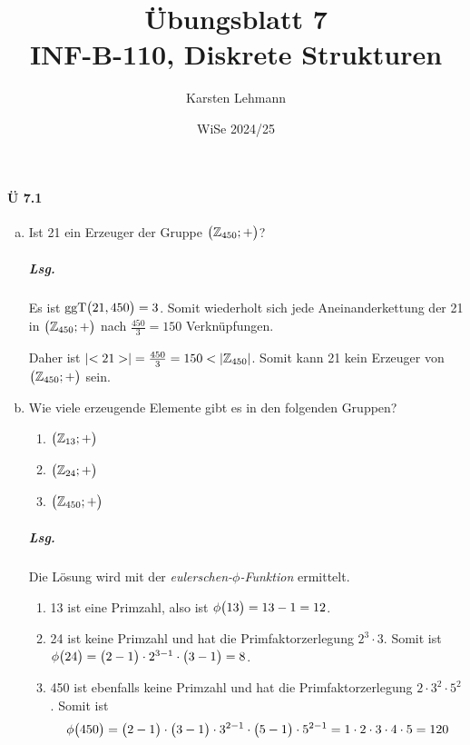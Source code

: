 \documentclass{scrreprt}
\author{Karsten Lehmann}
\date{WiSe 2024/25}
\title{Übungsblatt 7\\INF-B-110, Diskrete Strukturen}
\newcommand{\ggT}[0]{\text{ggT}}
\begin{document}
\paragraph{Ü 7.1}
\begin{enumerate}[(a)]
\item Ist 21 ein Erzeuger der Gruppe $\qty\big(\mathbb{Z}_{450}; +)$?

  \subparagraph{Lsg.} Es ist $\ggT\qty\big(21, 450) = 3$.
  Somit wiederholt sich jede Aneinanderkettung der 21 in
  $\qty\big(\mathbb{Z}_{450}; +)$ nach $\frac{450}{3} = 150$ Verknüpfungen.

  Daher ist $\abs{<21>} = \frac{450}{3} = 150 < \abs{\mathbb{Z}_{450}}$.
  Somit kann 21 kein Erzeuger von $\qty\big(\mathbb{Z}_{450}; +)$ sein.

\item Wie viele erzeugende Elemente gibt es in den folgenden Gruppen?
  \begin{enumerate}[(1)]
  \item $\qty\big(\mathbb{Z}_{13}; +)$
  \item $\qty\big(\mathbb{Z}_{24}; +)$
  \item $\qty\big(\mathbb{Z}_{450}; +)$
  \end{enumerate}

  \subparagraph{Lsg.} Die Lösung wird mit der \emph{eulerschen-$\phi$-Funktion}
  ermittelt.
  \begin{enumerate}[(1)]
  \item 13 ist eine Primzahl, also ist $\phi\qty\big(13) = 13 - 1 = 12$.
  \item 24 ist keine Primzahl und hat die Primfaktorzerlegung $2^3 \cdot 3$.
    Somit ist $\phi\qty\big(24)
    = \qty\big(2 - 1) \cdot 2^{3 - 1} \cdot \qty\big(3 - 1) = 8$.
  \item 450 ist ebenfalls keine Primzahl und hat die Primfaktorzerlegung
    $2 \cdot 3^2 \cdot 5^2$.
    Somit ist
    \[
      \phi\qty\big(450) =
      \qty\big(2 - 1) \cdot \qty\big(3 - 1) \cdot 3^{2 - 1} \cdot \qty\big(5 - 1) \cdot 5^{2 - 1}
      = 1 \cdot 2 \cdot 3 \cdot 4 \cdot 5
      = 120
    \]
  \end{enumerate}
\end{enumerate}
\end{document}

